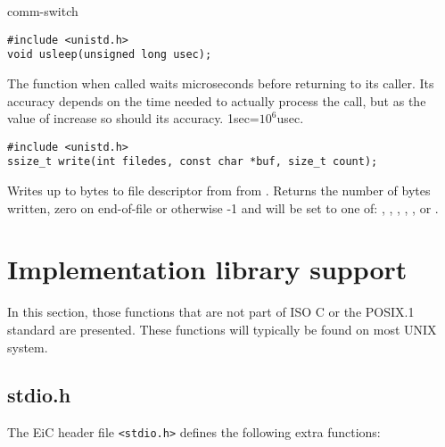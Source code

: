 \begin{Ventry2}{comm-switch  }
\item[usleep]
\label{item:usleep}
\begin{production}
\begin{verbatim}
#include <unistd.h>
void usleep(unsigned long usec);
\end{verbatim}
\end{production}

The  function when called waits  microseconds before
returning to its caller.  Its accuracy depends on the time needed to
actually process the call, but as the value of  increase so should its
accuracy. 1sec=$10^6$usec.


\item[write]
\label{item:write}
\begin{production}
\begin{verbatim}
#include <unistd.h>
ssize_t write(int filedes, const char *buf, size_t count);
\end{verbatim}
\end{production}
       
Writes up to  bytes to file descriptor  from from
. Returns the number of bytes written, zero on end-of-file or
otherwise -1 and  will be set to one of: , , 
, , ,  or . 


\end{Ventry2}


\section{Implementation library support}
\label{sec:ImplementationLibrary}

In this section, those functions that are not part of ISO C or the POSIX.1
standard are presented. These functions will typically be found
on most UNIX system.



\subsection{stdio.h}
\label{sec:stdiohImplementation}

The EiC header file \verb+<stdio.h>+ defines the following 
extra functions:


